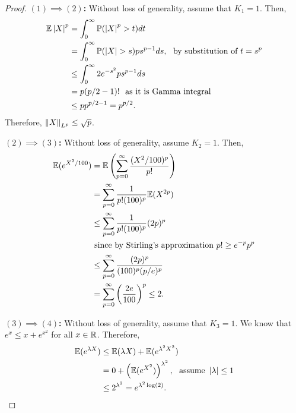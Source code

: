 \documentclass[12pt]{article}
\begin{document}
\begin{proof}
    \textbf{$(1) \implies (2)$:} Without loss of generality, assume that $K_1 = 1$. Then,
    \begin{align*}
        \mathbb{E}\left\lvert X \right\rvert^p
         & = \int_{0}^\infty \mathbb{P}(\left\lvert X \right\rvert^p > t) dt                                                \\
         & = \int_{0}^\infty \mathbb{P}(\left\lvert X \right\rvert > s) p s^{p-1} ds,\  \text{ by substitution of } t = s^p \\
         & \leq \int_{0}^\infty 2e^{-s^2} ps^{p-1} ds                                               \\
         & = p(p/2 - 1)! \ \text{ as it is Gamma integral }                                         \\
         & \leq p p^{p/2 - 1} = p^{p/2}.
    \end{align*}
    \noindent Therefore, $\left\Vert X \right\Vert_{L^p} \leq \sqrt{p}$.

    \textbf{$(2) \implies (3)$:} Without loss of generality, assume $K_2 = 1$. Then,
    \begin{align*}
        \mathbb{E}(e^{X^2/100})
         & = \mathbb{E}\left( \sum_{p=0}^\infty \dfrac{(X^2/100)^p}{p!} \right)   \\
         & = \sum_{p=0}^\infty \dfrac{1}{p! (100)^p} \mathbb{E}(X^{2p})           \\
         & \leq \sum_{p=0}^\infty \dfrac{1}{p! (100)^p} (2p)^{p}          \\
         & \text{ since by Stirling's approximation } p! \geq e^{-p}p^p   \\
         & \leq \sum_{p=0}^\infty \dfrac{(2p)^p}{(100)^p (p/e)^p}         \\
         & = \sum_{p=0}^{\infty} \left( \dfrac{2e}{100} \right)^p \leq 2.
    \end{align*}

    \textbf{$(3) \implies (4)$:} Without loss of generality, assume that $K_3 = 1$. We know that $e^x \leq x + e^{x^2}$ for all $x \in \mathbb{R}$. Therefore,
    \begin{align*}
        \mathbb{E}(e^{\lambda X})
         & \leq \mathbb{E}(\lambda X) + \mathbb{E}(e^{\lambda^2 X^2})                                           \\
         & = 0 + \left( \mathbb{E}(e^{X^2}) \right)^{\lambda^2}, \ \text{ assume } \left\lvert \lambda \right\rvert \leq 1 \\
         & \leq 2^{\lambda^2} = e^{\lambda^2 \log(2)}.
    \end{align*}


\end{proof}
\end{document}

